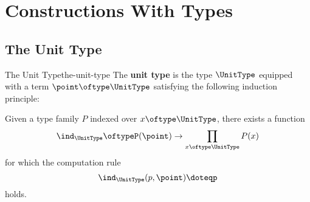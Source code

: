 \section{Constructions With Types}\label{section-constructions-with-types}
\subsection{The Unit Type}\label{subsection-the-unit-type}
\begin{definition}{The Unit Type}{the-unit-type}%
    The \textbf{unit type} is the type $\UnitType$ equipped with a term $\point\oftype\UnitType$ satisfying the following induction principle:
    \begin{itemize}
        \itemstar Given a type family $P$ indexed over $x\oftype\UnitType$, there exists a function
            \[
                \ind_{\UnitType}%
                \oftype%
                P(\point)%
                \to%
                \prod_{x\oftype\UnitType}P(x)%
            \]%
            for which the computation rule
            \[
                \ind_{\UnitType}(p,\point)%
                \doteq%
                p%
            \]%
            holds.
    \end{itemize}
\end{definition}
